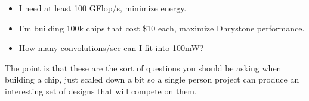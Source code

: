 \documentclass{article}
\begin{document}
\begin{itemize}
\item I need at least 100 GFlop/s, minimize energy.
\item I'm building 100k chips that cost \$10 each, maximize Dhrystone
performance.
\item How many convolutions/sec can I fit into 100mW?
\end{itemize}

The point is that these are the sort of questions you should be asking when
building a chip, just scaled down a bit so a single person project can produce
an interesting set of designs that will compete on them.
\end{document}
